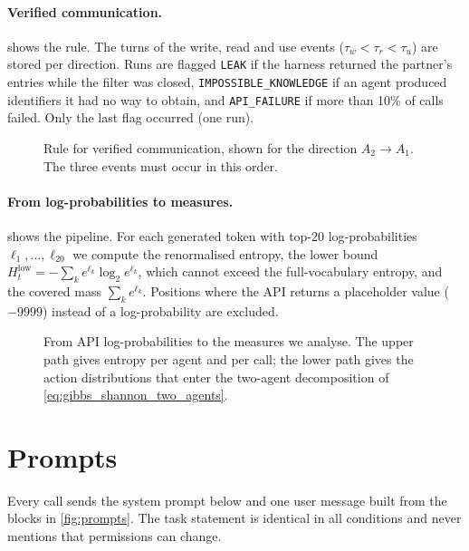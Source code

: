 \paragraph{Verified communication.}  shows the rule. The turns of the write, read and use events ($\tau_w < \tau_r < \tau_u$) are stored per direction. Runs are flagged \texttt{LEAK} if the harness returned the partner's entries while the filter was closed, \texttt{IMPOSSIBLE\_KNOWLEDGE} if an agent produced identifiers it had no way to obtain, and \texttt{API\_FAILURE} if more than 10\% of calls failed. Only the last flag occurred (one run).

\begin{figure}[H]
  \centering
  
  \caption{Rule for verified communication, shown for the direction $A_2 \to A_1$. The three events must occur in this order.}
  \label{fig:proof}
\end{figure}

\paragraph{From log-probabilities to measures.}  shows the pipeline. For each generated token with top-20 log-probabilities $\ell_1, \dots, \ell_{20}$ we compute the renormalised entropy, the lower bound $H^{\mathrm{low}}_t = -\sum_k e^{\ell_k} \log_2 e^{\ell_k}$, which cannot exceed the full-vocabulary entropy, and the covered mass $\sum_k e^{\ell_k}$. Positions where the API returns a placeholder value ($-9999$) instead of a log-probability are excluded.

\begin{figure}[H]
  \centering
  
  \caption{From API log-probabilities to the measures we analyse. The upper path gives entropy per agent and per call; the lower path gives the action distributions that enter the two-agent decomposition of \cref{eq:gibbs_shannon_two_agents}.}
  \label{fig:pipeline}
\end{figure}

\section{Prompts}
\label{app:prompts}

Every call sends the system prompt below and one user message built from the blocks in \cref{fig:prompts}. The task statement is identical in all conditions and never mentions that permissions can change.

